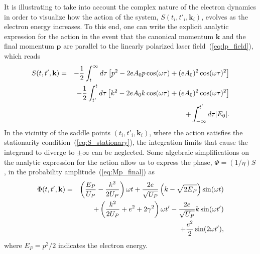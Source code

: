 It is illustrating to take into account the complex nature of the
electron dynamics in order to visualize how the action of the system,
$S(t_{i},t'_{i},\mathbf{k}_{i})$, evolves as the electron energy
increases. To this end, one can write the explicit analytic expression
for the action in the event that the canonical momentum $\mathbf{k}$
and the final momentum $\mathbf{p}$ are parallel to the linearly
polarized laser field~(\ref{eq:lp_field}), which reads
%
\begin{eqnarray}
  \label{eq:action_analytic}
S(t, t', \bf{k}) & = &
-\frac{1}{2} \int_{t}^{\infty} d\tau\left[ p^{2}
- 2eA_{0}p\cos(\omega\tau) + (eA_{0})^{2}\cos(\omega\tau)^{2} \right]\nonumber\\
&& -\frac{1}{2} \int_{t'}^{t} d\tau\left[k^{2}
- 2eA_{0}k\cos(\omega\tau) + (eA_{0})^{2}\cos(\omega\tau)^{2} \right]\nonumber\\
&& + \int_{-\infty}^{t'} d\tau|E_{0}|.
\end{eqnarray}
%
In the vicinity of the saddle points $(t_{i},t'_{i},\mathbf{k}_{i})$,
where the action satisfies the stationarity
condition~(\ref{eq:S_stationary}), the integration limits that cause
the integrand to diverge to $\pm\infty$ can be neglected. Some
algebraic simplifications on the analytic expression for the action
allow us to express the phase, $\Phi = (1/\eta)S$, in the probability
amplitude~(\ref{eq:Mp_final}) as
%
\begin{eqnarray}
  \label{eq:phase_final}
\Phi(t, t', \bf{k}) & = &
\left(\frac{E_{P}}{U_{P}} - \frac{k^{2}}{2U_{P}}\right) \omega t
+ \frac{2e}{\sqrt{U_{P}}} \left( k - \sqrt{2E_{P}}\right) \sin(\omega t) \nonumber\\
&&
+ \left( \frac{k^{2}}{2U_{P}} + e^{2}+2\gamma^{2} \right)\omega t'
- \frac{2e}{\sqrt{U_{P}}} k\sin(\omega t') \nonumber\\
&&
+ \frac{e^2}{2}\sin(2\omega t'),
\end{eqnarray}
%
where $E_{P} = p^{2}/2$ indicates the electron energy.


